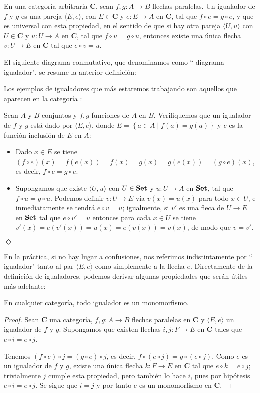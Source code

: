 \begin{Def}
   En una categoría arbitraria $\textbf{C}$, sean $f,g:A\to B$ flechas paralelas. Un igualador de $f$ y $g$ es una pareja $\langle E,e\rangle$, con $E\in\textbf{C}$ y $e:E\to A$ en $\textbf{C}$, tal que $f\circ e=g\circ e$, y que es universal con esta propiedad, en el sentido de que si hay otra pareja $\langle U,u\rangle$ con $U\in \textbf{C}$ y $u:U\to A$ en $\textbf{C}$, tal que $f\circ u=g\circ u$, entonces existe una única flecha $v:U\to E$ en $\textbf{C}$ tal que $e\circ v=u$. 
\end{Def}
El siguiente diagrama conmutativo, que denominamos como `` diagrama igualador", se resume la anterior definición:


Los ejemplos de igualadores que más estaremos trabajando son aquellos que aparecen en la categoría :
\begin{Ejm}
   Sean $A$ y $B$ conjuntos y $f,g$ funciones de $A$ en $B$. Verifiquemos que un igualador de $f$ y $g$ está dado por $\langle E,e\rangle$, donde $E=\left\lbrace a\in A\mid f(a)=g(a)\right\rbrace$ y $e$ es la función inclusión de $E$ en $A$:
   \begin{itemize}
      \item Dado $x\in E$ se tiene $(f\circ e)(x)=f(e(x))=f(x)=g(x)=g(e(x))=(g\circ e)(x)$, es decir, $f\circ e=g\circ e$.
      \item Supongamos que existe $\langle U,u\rangle$ con $U\in \normalfont{\textbf{Set}}$ y $u:U\to A$ en $\normalfont{\textbf{Set}}$, tal que $f\circ u=g\circ u$. Podemos definir $v:U\to E$ vía $v(x)=u(x)$ para todo $x\in U$, e inmediatamente se tendrá $e\circ v=u$; igualmente, si $v'$ es una fleca de $U\to E$ en $\normalfont{\textbf{Set}}$ tal que $e\circ v'=u$ entonces para cada $x\in U$ se tiene $v'(x)=e(v'(x))=u(x)=e(v(x))=v(x)$, de modo que $v=v'$.
   \end{itemize}
\hspace{\fill}$\Diamond$
\end{Ejm}
En la práctica, si no hay lugar a confusiones, nos referimos indistintamente por `` igualador" tanto al par $\langle E,e\rangle$ como simplemente a la flecha $e$. Directamente de la definición de igualadores, podemos derivar algunas propiedades que serán útiles más adelante:
\begin{Prop}\label{Prop:Igualadores1}
   En cualquier categoría, todo igualador es un monomorfismo.  
\end{Prop}
\begin{proof}
   Sean $\textbf{C}$ una categoría, $f,g:A\to B$ flechas paralelas en $\textbf{C}$ y $\langle E,e\rangle$ un igualador de $f$ y $g$. Supongamos que existen flechas $i,j:F\to E$ en $\textbf{C}$ tales que $e\circ i=e\circ j$.
   
   Tenemos $(f\circ e)\circ j=(g\circ e)\circ j$, es decir, $f\circ (e\circ j)=g\circ (e\circ j)$. Como $e$ es un igualador de $f$ y $g$, existe una única flecha $k:F\to E$ en $\textbf{C}$ tal que $e\circ k=e\circ j$; trivialmente $j$ cumple esta propiedad, pero también lo hace $i$, pues por hipótesis $e\circ i=e\circ j$. Se sigue que $i=j$ y por tanto $e$ es un monomorfismo en $\textbf{C}$.

\end{proof}
